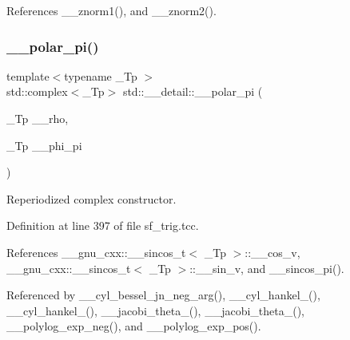 References \+\_\+\+\_\+znorm1(), and \+\_\+\+\_\+znorm2().

\mbox{\label{namespacestd_1_1____detail_ac69e259ad511fcc7a54c6ec315adcfa4}} 
\subsubsection{\texorpdfstring{\+\_\+\+\_\+polar\+\_\+pi()}{\_\_polar\_pi()}\hspace{0.1cm}{\footnotesize\ttfamily [1/2]}}
{\footnotesize\ttfamily template$<$typename \+\_\+\+Tp $>$ \\
std\+::complex$<$\+\_\+\+Tp$>$ std\+::\+\_\+\+\_\+detail\+::\+\_\+\+\_\+polar\+\_\+pi (\begin{DoxyParamCaption}\item[{\+\_\+\+Tp}]{\+\_\+\+\_\+rho,  }\item[{\+\_\+\+Tp}]{\+\_\+\+\_\+phi\+\_\+pi }\end{DoxyParamCaption})\hspace{0.3cm}{\ttfamily [inline]}}

Reperiodized complex constructor. 

Definition at line 397 of file sf\+\_\+trig.\+tcc.



References \+\_\+\+\_\+gnu\+\_\+cxx\+::\+\_\+\+\_\+sincos\+\_\+t$<$ \+\_\+\+Tp $>$\+::\+\_\+\+\_\+cos\+\_\+v, \+\_\+\+\_\+gnu\+\_\+cxx\+::\+\_\+\+\_\+sincos\+\_\+t$<$ \+\_\+\+Tp $>$\+::\+\_\+\+\_\+sin\+\_\+v, and \+\_\+\+\_\+sincos\+\_\+pi().



Referenced by \+\_\+\+\_\+cyl\+\_\+bessel\+\_\+jn\+\_\+neg\+\_\+arg(), \+\_\+\+\_\+cyl\+\_\+hankel\+\_(), \+\_\+\+\_\+cyl\+\_\+hankel\+\_(), \+\_\+\+\_\+jacobi\+\_\+theta\+\_(), \+\_\+\+\_\+jacobi\+\_\+theta\+\_(), \+\_\+\+\_\+polylog\+\_\+exp\+\_\+neg(), and \+\_\+\+\_\+polylog\+\_\+exp\+\_\+pos().

\mbox{\label{namespacestd_1_1____detail_a627c0e19f6b3e90af25735f351662d53}} 
